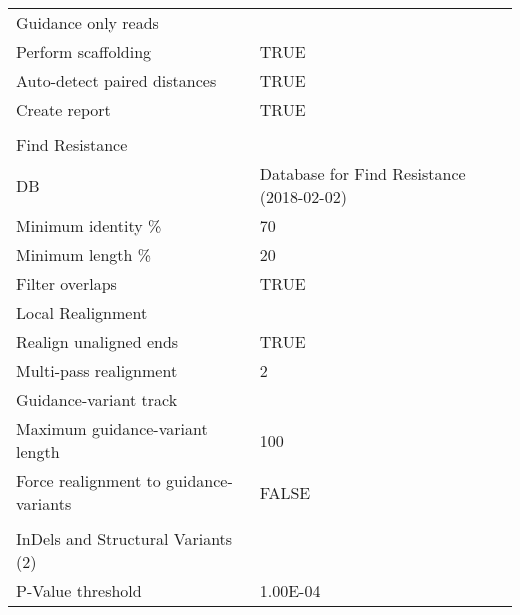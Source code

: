 \begin{longtable}{ll}
Guidance only reads                          &                                                \\
Perform scaffolding                          & TRUE                                           \\
Auto-detect paired distances                 & TRUE                                           \\
Create report                                & TRUE                                           \\
                                             &                                                \\
\multicolumn{2}{l}{Find Resistance}                                                           \\
DB                                           & Database for Find Resistance (2018-02-02)      \\
Minimum identity \%                          & 70                                             \\
Minimum length \%                            & 20                                             \\
Filter overlaps                              & TRUE                                           \\
Local Realignment                            &                                                \\
Realign unaligned ends                       & TRUE                                           \\
Multi-pass realignment                       & 2                                              \\
Guidance-variant track                       &                                                \\
Maximum guidance-variant length              & 100                                            \\
Force realignment to guidance-variants       & FALSE                                          \\
                                             &                                                \\
InDels and Structural Variants (2)           &                                                \\
P-Value threshold                            & 1.00E-04                                       \\

\end{longtable}
